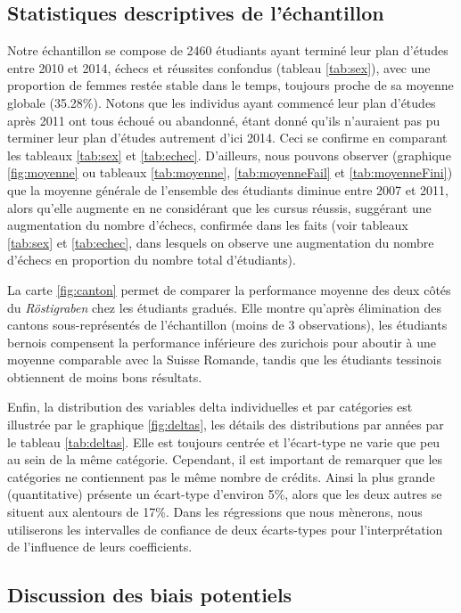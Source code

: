 
\subsection{Statistiques descriptives de l'échantillon}

Notre échantillon se compose de 2460 étudiants ayant terminé leur plan d'études entre 2010 et 2014, échecs et réussites confondus (tableau \ref{tab:sex}), avec une proportion de femmes restée stable dans le temps, toujours proche de sa moyenne globale (35.28\%). Notons que les individus ayant commencé leur plan d'études après 2011 ont tous échoué ou abandonné, étant donné qu'ils n'auraient pas pu terminer leur plan d'études autrement d'ici 2014. Ceci se confirme en comparant les tableaux \ref{tab:sex} et \ref{tab:echec}. D'ailleurs, nous pouvons observer (graphique \ref{fig:moyenne} ou tableaux \ref{tab:moyenne}, \ref{tab:moyenneFail} et \ref{tab:moyenneFini}) que la moyenne générale de l'ensemble des étudiants diminue entre 2007 et 2011, alors qu'elle augmente en ne considérant que les cursus réussis, suggérant une augmentation du nombre d'échecs, confirmée dans les faits (voir tableaux \ref{tab:sex} et \ref{tab:echec}, dans lesquels on observe une augmentation du nombre d'échecs en proportion du nombre total d'étudiants).

La carte \ref{fig:canton} permet de comparer la performance moyenne des deux côtés du \textit{Röstigraben} chez les étudiants gradués. Elle montre qu'après élimination des cantons sous-représentés de l'échantillon (moins de 3 observations), les étudiants bernois compensent la performance inférieure des zurichois pour aboutir à une moyenne comparable avec la Suisse Romande, tandis que les étudiants tessinois obtiennent de moins bons résultats.

Enfin, la distribution des variables delta individuelles et par catégories est illustrée par le graphique \ref{fig:deltas}, les détails des distributions par années par le tableau \ref{tab:deltas}. Elle est toujours centrée et l'écart-type ne varie que peu au sein de la même catégorie. Cependant, il est important de remarquer que les catégories ne contiennent pas le même nombre de crédits. Ainsi la plus grande (quantitative) présente un écart-type d'environ 5\%, alors que les deux autres se situent aux alentours de 17\%. Dans les régressions que nous mènerons, nous utiliserons les intervalles de confiance de deux écarts-types pour l'interprétation de l'influence de leurs coefficients.


\subsection{Discussion des biais potentiels}
 

